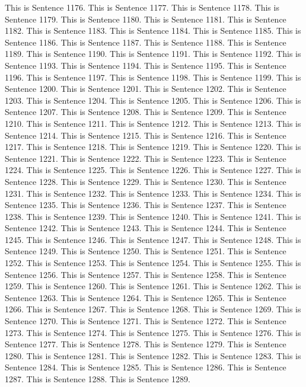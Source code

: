 \documentclass{article}
\begin{document}
This is Sentence 1176.
This is Sentence 1177.
This is Sentence 1178.
This is Sentence 1179.
This is Sentence 1180.
This is Sentence 1181.
This is Sentence 1182.
This is Sentence 1183.
This is Sentence 1184.
This is Sentence 1185.
This is Sentence 1186.
This is Sentence 1187.
This is Sentence 1188.
This is Sentence 1189.
This is Sentence 1190.
This is Sentence 1191.
This is Sentence 1192.
This is Sentence 1193.
This is Sentence 1194.
This is Sentence 1195.
This is Sentence 1196.
This is Sentence 1197.
This is Sentence 1198.
This is Sentence 1199.
This is Sentence 1200.
This is Sentence 1201.
This is Sentence 1202.
This is Sentence 1203.
This is Sentence 1204.
This is Sentence 1205.
This is Sentence 1206.
This is Sentence 1207.
This is Sentence 1208.
This is Sentence 1209.
This is Sentence 1210.
This is Sentence 1211.
This is Sentence 1212.
This is Sentence 1213.
This is Sentence 1214.
This is Sentence 1215.
This is Sentence 1216.
This is Sentence 1217.
This is Sentence 1218.
This is Sentence 1219.
This is Sentence 1220.
This is Sentence 1221.
This is Sentence 1222.
This is Sentence 1223.
This is Sentence 1224.
This is Sentence 1225.
This is Sentence 1226.
This is Sentence 1227.
This is Sentence 1228.
This is Sentence 1229.
This is Sentence 1230.
This is Sentence 1231.
This is Sentence 1232.
This is Sentence 1233.
This is Sentence 1234.
This is Sentence 1235.
This is Sentence 1236.
This is Sentence 1237.
This is Sentence 1238.
This is Sentence 1239.
This is Sentence 1240.
This is Sentence 1241.
This is Sentence 1242.
This is Sentence 1243.
This is Sentence 1244.
This is Sentence 1245.
This is Sentence 1246.
This is Sentence 1247.
This is Sentence 1248.
This is Sentence 1249.
This is Sentence 1250.
This is Sentence 1251.
This is Sentence 1252.
This is Sentence 1253.
This is Sentence 1254.
This is Sentence 1255.
This is Sentence 1256.
This is Sentence 1257.
This is Sentence 1258.
This is Sentence 1259.
This is Sentence 1260.
This is Sentence 1261.
This is Sentence 1262.
This is Sentence 1263.
This is Sentence 1264.
This is Sentence 1265.
This is Sentence 1266.
This is Sentence 1267.
This is Sentence 1268.
This is Sentence 1269.
This is Sentence 1270.
This is Sentence 1271.
This is Sentence 1272.
This is Sentence 1273.
This is Sentence 1274.
This is Sentence 1275.
This is Sentence 1276.
This is Sentence 1277.
This is Sentence 1278.
This is Sentence 1279.
This is Sentence 1280.
This is Sentence 1281.
This is Sentence 1282.
This is Sentence 1283.
This is Sentence 1284.
This is Sentence 1285.
This is Sentence 1286.
This is Sentence 1287.
This is Sentence 1288.
This is Sentence 1289.
\end{document}
